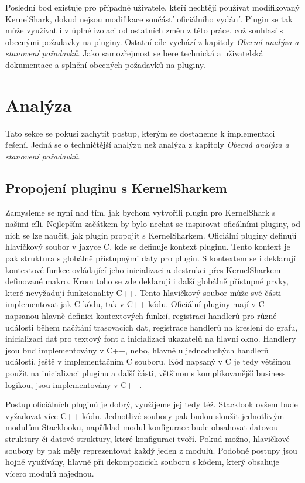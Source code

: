 Poslední bod existuje pro případné uživatele, kteří nechtějí používat modifikovaný KernelShark, dokud nejsou modifikace součástí oficiálního vydání. Plugin se tak může využívat i v úplné izolaci od ostatních změn z této práce, což souhlasí s obecnými požadavky na pluginy. Ostatní cíle vychází z kapitoly \emph{Obecná analýza a stanovení požadavků}. Jako samozřejmost se bere technická a uživatelská dokumentace a splnění obecných požadavků na pluginy.

\section{Analýza}
Tato sekce se pokusí zachytit postup, kterým se dostaneme k implementaci řešení. Jedná se o techničtější analýzu než analýza z kapitoly \emph{Obecná analýza a stanovení požadavků}.

\subsection{Propojení pluginu s KernelSharkem}
Zamysleme se nyní nad tím, jak bychom vytvořili plugin pro KernelShark s našimi cíli. Nejlepším začátkem by bylo nechat se inspirovat oficálními pluginy, od nich se lze naučit, jak plugin propojit s KernelSharkem. Oficiální pluginy definují hlavičkový soubor v jazyce C, kde se definuje kontext pluginu. Tento kontext je pak struktura s globálně přístupnými daty pro plugin. S kontextem se i deklarují kontextové funkce ovládající jeho inicializaci a destrukci přes KernelSharkem definované makro. Krom toho se zde deklarují i další globálně přístupné prvky, které nevyžadují funkcionality C++. Tento hlavičkový soubor může své části implementovat jak C kódu, tak v C++ kódu. Oficiální pluginy mají v C napsanou hlavně definici kontextových funkcí, registraci handlerů pro různé události během načítání trasovacích dat, registrace handlerů na kreslení do grafu, inicializaci dat pro textový font a inicializaci ukazatelů na hlavní okno. Handlery jsou buď implementovány v C++, nebo, hlavně u jednoduchých handlerů událostí, ještě v implementačním C souboru. Kód napsaný v C je tedy většinou použit na inicializaci pluginu a další části, většinou s komplikovanější business logikou, jsou implementovány v C++.

Postup oficiálních pluginů je dobrý, využijeme jej tedy též. Stacklook ovšem bude vyžadovat více C++ kódu. Jednotlivé soubory pak budou sloužit jednotlivým modulům Stacklooku, například modul konfigurace bude obsahovat datovou struktury či datové struktury, které konfiguraci tvoří. Pokud možno, hlavičkové soubory by pak měly reprezentovat každý jeden z modulů. Podobné postupy jsou hojně využívány, hlavně při dekompozicích souboru s kódem, který obsahuje vícero modulů najednou.

